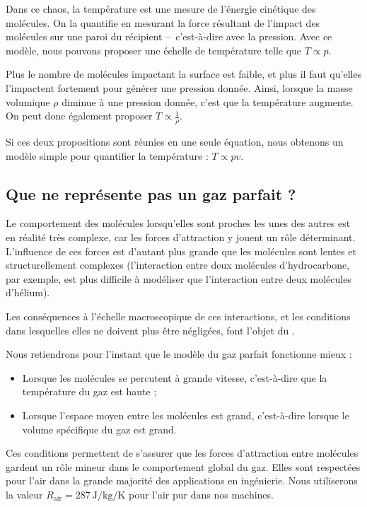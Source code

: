 		Dans ce chaos, la température est une mesure de l’énergie cinétique des molécules. On la quantifie en mesurant la force résultant de l’impact des molécules sur une paroi du récipient --\ c’est-à-dire avec la pression. Avec ce modèle, nous pouvons proposer une échelle de température telle que $T \propto p$.
		
		Plus le nombre de molécules impactant la surface est faible, et plus il faut qu’elles l’impactent fortement pour générer une pression donnée. Ainsi, lorsque la masse volumique $\rho$ diminue à une pression donnée, c’est que la température augmente. On peut donc également proposer $T \propto \frac{1}{\rho}$.
		
		Si ces deux propositions sont réunies en une seule équation, nous obtenons un modèle simple pour quantifier la température : $T \propto p v$.
		
		
	\subsection{Que ne représente pas un gaz parfait ?}
	\label{ch_pas_gaz_parfait}		
		
		Le comportement des molécules lorsqu’elles sont proches les unes des autres est en réalité très complexe, car les forces d’attraction y jouent un rôle déterminant. L’influence de ces forces est d’autant plus grande que les molécules sont lentes et structurellement complexes (l’interaction entre deux molécules d’hydrocarbone, par exemple, est plus difficile à modéliser que l’interaction entre deux molécules d’hélium).

		Les conséquences à l’échelle macroscopique de ces interactions, et les conditions dans lesquelles elles ne doivent plus être négligées, font l’objet du \courscinq.

		Nous retiendrons pour l’instant que le modèle du gaz parfait fonctionne mieux :

		\begin{itemize}
			\item Lorsque les molécules se percutent à grande vitesse, c’est-à-dire que la température du gaz est haute ;
			\item Lorsque l’espace moyen entre les molécules est grand, c’est-à-dire lorsque le volume spécifique du gaz est grand.
		\end{itemize}
		
		Ces conditions permettent de s’assurer que les forces d’attraction entre molécules gardent un rôle mineur dans le comportement global du gaz. Elles sont respectées pour l’air dans la grande majorité des applications en ingénierie. Nous utiliserons la valeur $R_\text{air} = \SI{287}{\joule\per\kilogram\per\kelvin}$ pour l’air pur dans nos machines.


